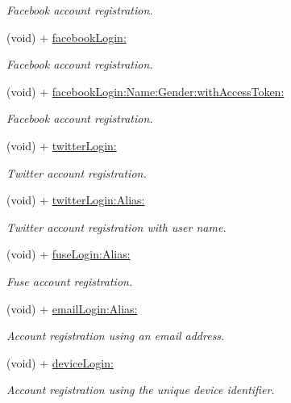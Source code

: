\begin{DoxyCompactItemize}
\begin{DoxyCompactList}\small\item\em Facebook account registration. \end{DoxyCompactList}\item 
(void) + \hyperlink{interface_fuse_s_d_k_a04c181e3ec49e81ba081a5041df412f6}{facebook\+Login\+:}
\begin{DoxyCompactList}\small\item\em Facebook account registration. \end{DoxyCompactList}\item 
(void) + \hyperlink{interface_fuse_s_d_k_a38487be821059910b1b939d818cd0e9f}{facebook\+Login\+:\+Name\+:\+Gender\+:with\+Access\+Token\+:}
\begin{DoxyCompactList}\small\item\em Facebook account registration. \end{DoxyCompactList}\item 
(void) + \hyperlink{interface_fuse_s_d_k_add5138c113d6e4c1201f70bf8b84eb02}{twitter\+Login\+:}
\begin{DoxyCompactList}\small\item\em Twitter account registration. \end{DoxyCompactList}\item 
(void) + \hyperlink{interface_fuse_s_d_k_a48950b5880ce336cc601a752bcda1a3a}{twitter\+Login\+:\+Alias\+:}
\begin{DoxyCompactList}\small\item\em Twitter account registration with user name. \end{DoxyCompactList}\item 
(void) + \hyperlink{interface_fuse_s_d_k_af7b69ec93b7a26b8512d730db9383511}{fuse\+Login\+:\+Alias\+:}
\begin{DoxyCompactList}\small\item\em Fuse account registration. \end{DoxyCompactList}\item 
(void) + \hyperlink{interface_fuse_s_d_k_a6b16a24e8cb2fdd04b8be9e501259135}{email\+Login\+:\+Alias\+:}
\begin{DoxyCompactList}\small\item\em Account registration using an email address. \end{DoxyCompactList}\item 
(void) + \hyperlink{interface_fuse_s_d_k_ae3a27f858739fee7ad6483a909206943}{device\+Login\+:}
\begin{DoxyCompactList}\small\item\em Account registration using the unique device identifier. \end{DoxyCompactList}\item 

\end{DoxyCompactItemize}
